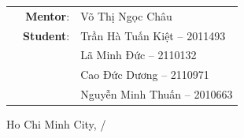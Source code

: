 \documentclass[12pt,a4paper]{article}
\begin{document}
\begin{titlepage}
    \vspace{1cm}
    \begin{table}[H]
        \begin{tabular}{rrl}
        \hspace{5 cm} & \textbf{Mentor}: & Võ Thị Ngọc Châu\\
        
        & \textbf{Student}: & Trần Hà Tuấn Kiệt -- 2011493 \\
        & & Lã Minh Đức -- 2110132 \\
        & & Cao Đức Dương -- 2110971 \\
        & & Nguyễn Minh Thuấn -- 2010663 \\
        
        \end{tabular}
        \end{table}
    \vspace{1cm}

    \begin{center}
        {\large Ho Chi Minh City, \the\month/\the\year}
    \end{center}
\end{titlepage}


\newpage
\end{document}
